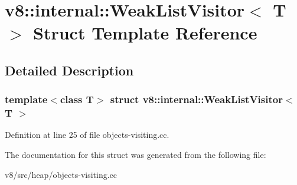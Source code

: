 \hypertarget{structv8_1_1internal_1_1WeakListVisitor}{}\section{v8\+:\+:internal\+:\+:Weak\+List\+Visitor$<$ T $>$ Struct Template Reference}
\label{structv8_1_1internal_1_1WeakListVisitor}


\subsection{Detailed Description}
\subsubsection*{template$<$class T$>$\newline
struct v8\+::internal\+::\+Weak\+List\+Visitor$<$ T $>$}



Definition at line 25 of file objects-\/visiting.\+cc.



The documentation for this struct was generated from the following file\+:\begin{DoxyCompactItemize}
\item 
v8/src/heap/objects-\/visiting.\+cc\end{DoxyCompactItemize}
